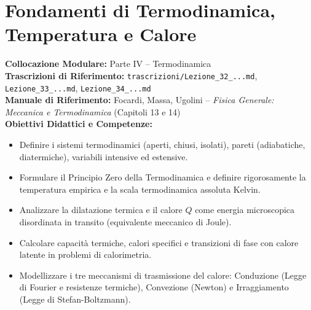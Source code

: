 \chapter{Fondamenti di Termodinamica, Temperatura e Calore}
\label{chap:termodinamica_fondamenti}

\begin{tcolorbox}[enhanced, breakable, colback=navyblue!4!white, colframe=navyblue!80!black,
    coltitle=white, fonttitle=\bfseries\sffamily, title={Quadro Sinottico del Capitolo 12 (Corrispondenza: Lezioni 32, 33 e 34)},
    sharp corners, rounded corners=south, boxrule=1pt]
\textbf{Collocazione Modulare:} Parte IV -- Termodinamica\\
\textbf{Trascrizioni di Riferimento:} \texttt{trascrizioni/Lezione\_32\_...md}, \texttt{Lezione\_33\_...md}, \texttt{Lezione\_34\_...md}\\
\textbf{Manuale di Riferimento:} Focardi, Massa, Ugolini -- \emph{Fisica Generale: Meccanica e Termodinamica} (Capitoli 13 e 14)\\
\textbf{Obiettivi Didattici e Competenze:}\par
\begin{itemize}
    \item Definire i sistemi termodinamici (aperti, chiusi, isolati), pareti (adiabatiche, diatermiche), variabili intensive ed estensive.
    \item Formulare il Principio Zero della Termodinamica e definire rigorosamente la temperatura empirica e la scala termodinamica assoluta Kelvin.
    \item Analizzare la dilatazione termica e il calore $Q$ come energia microscopica disordinata in transito (equivalente meccanico di Joule).
    \item Calcolare capacità termiche, calori specifici e transizioni di fase con calore latente in problemi di calorimetria.
    \item Modellizzare i tre meccanismi di trasmissione del calore: Conduzione (Legge di Fourier e resistenze termiche), Convezione (Newton) e Irraggiamento (Legge di Stefan-Boltzmann).
\end{itemize}
\end{tcolorbox}

\vspace{0.5em}

